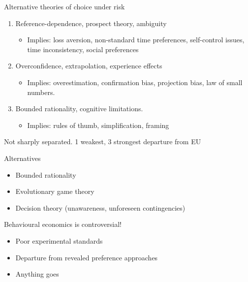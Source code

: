 \begin{frame}{Alternative theories of choice under risk}
    \begin{enumerate}
        \item Reference-dependence, prospect theory, ambiguity\medskip
        \begin{itemize}
        \item Implies: loss aversion, non-standard time preferences, self-control issues, time inconsistency, social preferences
        \end{itemize}\medskip
        \item Overconfidence, extrapolation, experience effects\medskip
         \begin{itemize}
        \item Implies: overestimation, confirmation bias, projection bias, law of small numbers.  \end{itemize}\medskip
                \item Bounded rationality, cognitive limitations.\medskip
        \begin{itemize}
        \item Implies: rules of thumb, simplification, framing
        \end{itemize}\medskip
    \end{enumerate}
    Not sharply separated.  1 weakest, 3 strongest departure  from EU
\end{frame}

\begin{frame}{Alternatives}
    \begin{itemize}
        \item Bounded rationality\bigskip
        \item Evolutionary game theory\bigskip
        \item Decision theory (unawareness, unforeseen contingencies)\bigskip
    \end{itemize}\bigskip
\end{frame}
\begin{frame}{Behavioural economics is controversial!}
    \begin{itemize}
        \item Poor experimental standards\medskip
        \item Departure from revealed preference approaches\medskip
        \item Anything goes\medskip
    \end{itemize}
\end{frame}

